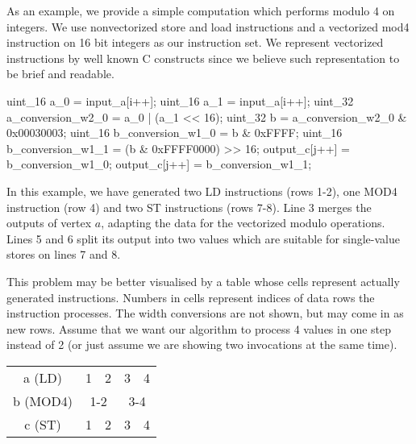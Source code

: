 As an example, we provide a simple computation which performs modulo 4 on integers. We use nonvectorized store and load instructions and a vectorized mod4 instruction on 16 bit integers as our instruction set. We represent vectorized instructions by well known C constructs since we believe such representation to be brief and readable.


\mybeginfig
\begin{code}
uint_16 a_0 = input_a[i++];
uint_16 a_1 = input_a[i++];
uint_32 a_conversion_w2_0 = a_0 | (a_1 << 16);
uint_32 b = a_conversion_w2_0 & 0x00030003;
uint_16 b_conversion_w1_0 = b & 0xFFFF;
uint_16 b_conversion_w1_1 = (b & 0xFFFF0000) >> 16;
output_c[j++] = b_conversion_w1_0;
output_c[j++] = b_conversion_w1_1;
\end{code}

In this example, we have generated two LD instructions (rows 1-2), one MOD4 instruction (row 4) and two ST instructions (rows 7-8). Line 3 merges the outputs of vertex $a$, adapting the data for the vectorized modulo operations. Lines 5 and 6 split its output into two values which are suitable for single-value stores on lines 7 and 8.


This problem may be better visualised by a table whose cells represent actually generated instructions. Numbers in cells represent indices of data rows the instruction processes. The width conversions are not shown, but may come in as new rows. Assume that we want our algorithm to process 4 values in one step instead of 2 (or just assume we are showing two invocations at the same time).

\mybeginfig
\begin{center}
\begin{tabular}{c|c|c|c|c|}
  \cline{2-5}
a (LD) & 1 & 2 & 3 & 4\\
  \cline{2-5}
b (MOD4) & \multicolumn{2}{c|}{1-2} & \multicolumn{2}{c|}{3-4}\\
  \cline{2-5}
c (ST) & 1 & 2 & 3 & 4\\
  \cline{2-5}
\end{tabular}
\end{center}


